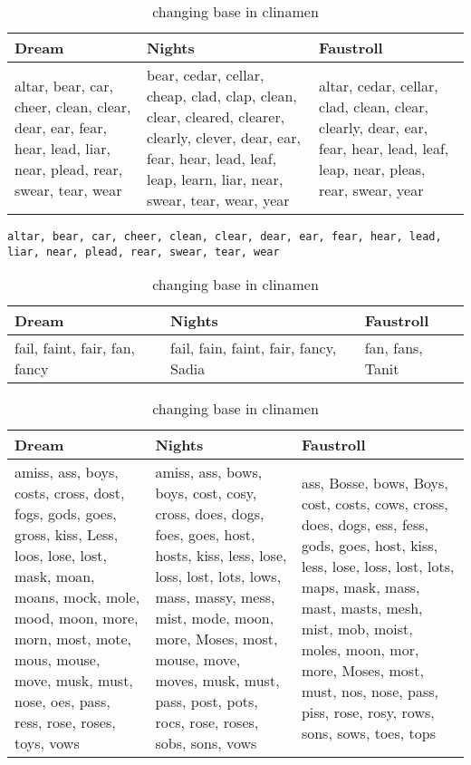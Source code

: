 {\begin{table}
  \centering
  \begin{tabu}{X[l]X[1.5,l]X[l]}
  \toprule
  \textbf{Dream} & \textbf{Nights} & \textbf{Faustroll}\\
  \midrule
  altar, bear, car, cheer, clean, clear, dear, ear, fear, hear, lead, liar, near, plead, rear, swear, tear, wear & bear, cedar, cellar, cheap, clad, clap, clean, clear, cleared, clearer, clearly, clever, dear, ear, fear, hear, lead, leaf, leap, learn, liar, near, swear, tear, wear, year & altar, cedar, cellar, clad, clean, clear, clearly, dear, ear, fear, hear, lead, leaf, leap, near, pleas, rear, swear, year\\
  \bottomrule
  \end{tabu}
\caption[Changing base in clinamen]{changing base in clinamen}
\label{tab:baseclear}
\end{table}

\begin{verbatim}
altar, bear, car, cheer, clean, clear, dear, ear, fear, hear, lead, liar, near, plead, rear, swear, tear, wear
\end{verbatim}


\begin{table}
  \centering
  \begin{tabu}{X[l]X[1.5,l]X[l]}
  \toprule
  \textbf{Dream} & \textbf{Nights} & \textbf{Faustroll}\\
  \midrule
  fail, faint, fair, fan, fancy & fail, fain, faint, fair, fancy, Sadia & fan, fans, Tanit\\
  \bottomrule
  \end{tabu}
\caption[Changing base in clinamen]{changing base in clinamen}
\label{tab:basefania}
\end{table}

\begin{table}
  \centering
  \begin{tabu}{X[l]X[l]X[l]}
  \toprule
  \textbf{Dream} & \textbf{Nights} & \textbf{Faustroll}\\
  \midrule
  amiss, ass, boys, costs, cross, dost, fogs, gods, goes, gross, kiss, Less, loos, lose, lost, mask, moan, moans, mock, mole, mood, moon, more, morn, most, mote, mous, mouse, move, musk, must, nose, oes, pass, ress, rose, roses, toys, vows & amiss, ass, bows, boys, cost, cosy, cross, does, dogs, foes, goes, host, hosts, kiss, less, lose, loss, lost, lots, lows, mass, massy, mess, mist, mode, moon, more, Moses, most, mouse, move, moves, musk, must, pass, post, pots, rocs, rose, roses, sobs, sons, vows & ass, Bosse, bows, Boys, cost, costs, cows, cross, does, dogs, ess, fess, gods, goes, host, kiss, less, lose, loss, lost, lots, maps, mask, mass, mast, masts, mesh, mist, mob, moist, moles, moon, mor, more, Moses, most, must, nos, nose, pass, piss, rose, rosy, rows, sons, sows, toes, tops\\
  \bottomrule
  \end{tabu}
\caption[Changing base in clinamen]{changing base in clinamen}
\label{tab:basemoss}
\end{table}


}
